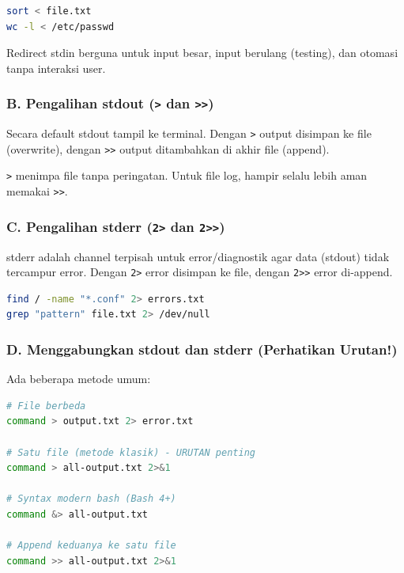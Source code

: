 \begin{lstlisting}[language=bash, caption={Contoh redirect stdin dari file}]
sort < file.txt
wc -l < /etc/passwd
\end{lstlisting}

\begin{tipbox}
Redirect stdin berguna untuk input besar, input berulang (testing), dan otomasi tanpa interaksi user.
\end{tipbox}

\subsubsection*{B. Pengalihan stdout (\texttt{>} dan \texttt{>>})}
Secara default stdout tampil ke terminal. Dengan \texttt{>} output disimpan ke file (overwrite),
dengan \texttt{>>} output ditambahkan di akhir file (append).

\begin{warningbox}
\texttt{>} menimpa file tanpa peringatan.
Untuk file log, hampir selalu lebih aman memakai \texttt{>>}.
\end{warningbox}

\subsubsection*{C. Pengalihan stderr (\texttt{2>} dan \texttt{2>>})}
stderr adalah channel terpisah untuk error/diagnostik agar data (stdout) tidak tercampur error.
Dengan \texttt{2>} error disimpan ke file, dengan \texttt{2>>} error di-append.

\begin{lstlisting}[language=bash, caption={Redirect stderr}]
find / -name "*.conf" 2> errors.txt
grep "pattern" file.txt 2> /dev/null
\end{lstlisting}

\subsubsection*{D. Menggabungkan stdout dan stderr (Perhatikan Urutan!)}
Ada beberapa metode umum:

\begin{lstlisting}[language=bash, caption={Metode umum redirect stdout+stderr}]
# File berbeda
command > output.txt 2> error.txt

# Satu file (metode klasik) - URUTAN penting
command > all-output.txt 2>&1

# Syntax modern bash (Bash 4+)
command &> all-output.txt

# Append keduanya ke satu file
command >> all-output.txt 2>&1
\end{lstlisting}

